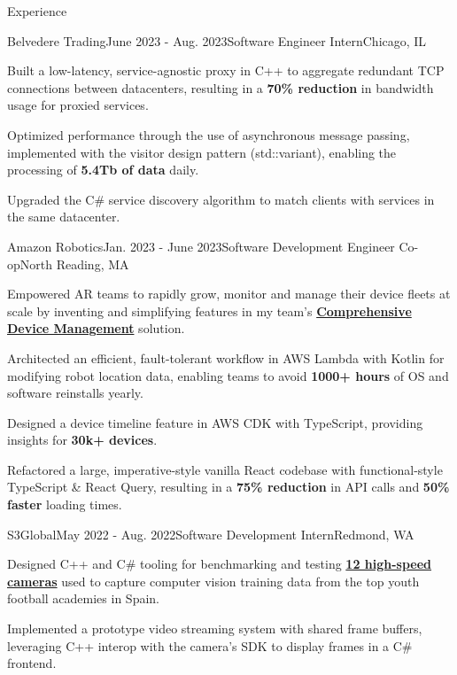 \documentclass{resume}
\begin{document}
  \begin{rSection}{Experience}

    \begin{rSubsection}{Belvedere Trading}{June 2023 - Aug. 2023}{Software Engineer Intern}{Chicago, IL}
      \item Built a low-latency, service-agnostic proxy in C++ to aggregate redundant TCP
        connections between datacenters, resulting in a \textbf{70\% reduction} in bandwidth usage for proxied services.
      \item Optimized performance through the use of asynchronous message passing, implemented with the visitor
        design pattern (std::variant), enabling the processing of \textbf{5.4Tb of data} daily.      
      \item Upgraded the C\# service discovery algorithm to match clients with services in the same datacenter.
    \end{rSubsection}

    \begin{rSubsection}{Amazon Robotics}{Jan. 2023 - June 2023}{Software Development Engineer Co-op}{North Reading, MA}
      \item Empowered AR teams to rapidly grow, monitor and manage their device fleets at scale by inventing and simplifying
        features in my team's 
        \textbf{\href{https://www.allthingsdistributed.com/2021/07/amazon-robotics-on-aws.html}{Comprehensive Device Management}} solution. 
      \item Architected an efficient, fault-tolerant workflow in AWS Lambda with Kotlin for modifying 
        robot location data, enabling teams to avoid \textbf{1000+ hours} of OS and software reinstalls yearly.
      \item Designed a device timeline feature in AWS CDK with TypeScript, providing insights for \textbf{30k+ devices}. 
      \item Refactored a large, imperative-style vanilla React codebase with functional-style 
        TypeScript \& React Query, resulting in a \textbf{75\% reduction} in API calls and \textbf{50\% faster} loading times.
    \end{rSubsection}

    \begin{rSubsection}{S3Global}{May 2022 - Aug. 2022}{Software Development Intern}{Redmond, WA}
    \item Designed C++ and C\# tooling for benchmarking and testing 
      \textbf{\href{https://emergentvisiontec.com/}{12 high-speed cameras}} used to capture 
        computer vision training data from the top youth football academies in Spain.
      \item Implemented a prototype video streaming system with shared frame buffers, leveraging C++ interop with the camera's SDK
        to display frames in a C\# frontend.
    \end{rSubsection}

  \end{rSection}
  
\end{document}
